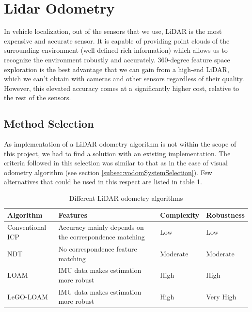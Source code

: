 

\section{Lidar Odometry}
In vehicle localization, out of the sensors that we use, \gls{LiDAR} is the most expensive and accurate sensor. It is capable of providing point clouds of the surrounding environment (well-defined rich information) which allows us to recognize the environment robustly and accurately. 360-degree feature space exploration is the best advantage that we can gain from a high-end \gls{LiDAR}, which we can’t obtain with cameras and other sensors regardless of their quality. However, this elevated accuracy comes at a significantly higher cost, relative to the rest of the sensors.

\subsection{Method Selection}
As implementation of a \gls{LiDAR} odometry algorithm is not within the scope of this project, we had to find a solution with an existing implementation. The criteria followed in this selection was similar to that as in the case of visual odometry algorithm (see section \ref{subsec:vodomSystemSelection}). Few alternatives that could be used in this respect are listed in table \ref{table:ha:DifferentLOdomMethods}.
\begin{table}[htp]
	\centering
	\begin{tabular}{|p{}|p{}|p{}|p{}|} 
		\hline
		\textbf{Algorithm} & \textbf{Features} & \textbf{Complexity} & \textbf{Robustness} \\
		\hline
		Conventional \gls{ICP}&Accuracy mainly depends on the correspondence
		matching&Low&Low\\
		\hline
		\gls{NDT}&No correspondence feature matching&Moderate&Moderate\\
		\hline
		\gls{LOAM}&IMU data makes estimation more robust& High & High\\
		\hline
		\gls{LeGO-LOAM}&IMU data makes estimation more robust& High & Very High\\
		\hline
	\end{tabular}
	\caption{Different LiDAR odometry algorithms}
	\label{table:ha:DifferentLOdomMethods}
	\vspace{0.5cm}
\end{table}

